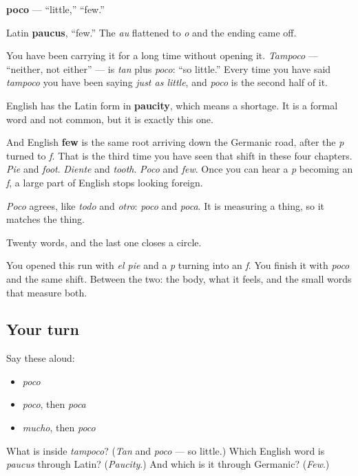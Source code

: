 \begin{cousinweb}
\textbf{poco} — \textquotedblleft{}little,\textquotedblright{} \textquotedblleft{}few.\textquotedblright{}

Latin \textbf{paucus}, \textquotedblleft{}few.\textquotedblright{} The \emph{au} flattened to \emph{o} and the ending came off.

You have been carrying it for a long time without opening it. \emph{Tampoco} — \textquotedblleft{}neither, not either\textquotedblright{} — is \emph{tan} plus \emph{poco}: \textquotedblleft{}so little.\textquotedblright{} Every time you have said \emph{tampoco} you have been saying \emph{just as little}, and \emph{poco} is the second half of it.

English has the Latin form in \textbf{paucity}, which means a shortage. It is a formal word and not common, but it is exactly this one.

And English \textbf{few} is the same root arriving down the Germanic road, after the \emph{p} turned to \emph{f}. That is the third time you have seen that shift in these four chapters. \emph{Pie} and \emph{foot}. \emph{Diente} and \emph{tooth}. \emph{Poco} and \emph{few}. Once you can hear a \emph{p} becoming an \emph{f}, a large part of English stops looking foreign.

\emph{Poco} agrees, like \emph{todo} and \emph{otro}: \emph{poco} and \emph{poca}. It is measuring a thing, so it matches the thing.
\end{cousinweb}

\begin{grammarlens}[title={What you've built}]
Twenty words, and the last one closes a circle.

You opened this run with \emph{el pie} and a \emph{p} turning into an \emph{f}. You finish it with \emph{poco} and the same shift. Between the two: the body, what it feels, and the small words that measure both.
\end{grammarlens}

\subsection*{Your turn}
Say these aloud:

\begin{itemize}
\raggedright
  \item \emph{poco}
  \item \emph{poco}, then \emph{poca}
  \item \emph{mucho}, then \emph{poco}
\end{itemize}

\begin{tcolorbox}[breakable,colback=teal!4,colframe=teal!35!black,title={Before you move on}]
What is inside \emph{tampoco}? (\emph{Tan} and \emph{poco} — so little.) Which English word is \emph{paucus} through Latin? (\emph{Paucity}.) And which is it through Germanic? (\emph{Few}.)
\end{tcolorbox}
